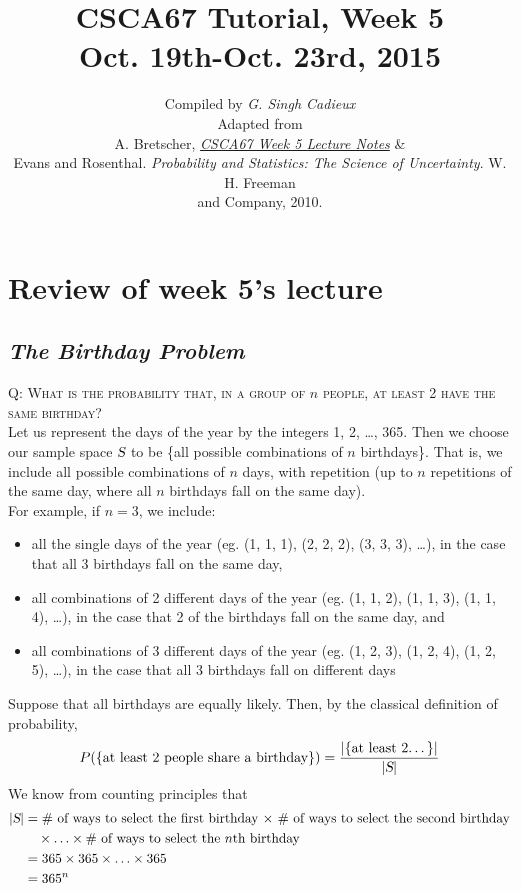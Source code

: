 \documentclass{article}
\title{\sc\LARGE CSCA67 Tutorial, Week 5\\
{\Large Oct. 19th-Oct. 23rd, 2015}}
\date{}
\author{\sc Compiled by {\em G. Singh Cadieux}\\[1ex]
\sc Adapted from\\
A. Bretscher, \href{http://www.utsc.utoronto.ca/~bretscher/a67/lectures/w5.pdf}{\em CSCA67 Week 5 Lecture Notes} \&\\
Evans and Rosenthal. \textit{Probability and Statistics: The Science of Uncertainty}.
W. H. Freeman\\
and Company, 2010.}
\begin{document}
\maketitle

\section{\sc Review of week 5's lecture}
\subsection{\em The Birthday Problem}

\textsc{Q: What is the probability that, in a group of $n$ people, at least 2 have the same birthday?}\\[1em]
Let us represent the days of the year by the integers 1, 2, \ldots, 365. Then we choose our sample space $\textsl{S}$ to be \{all possible combinations of $n$ birthdays\}. That is, we include all possible combinations of $n$ days, with repetition (up to $n$ repetitions of the same day, where all $n$ birthdays fall on the same day).\\[1ex]
For example, if $n=3$, we include:
\begin{itemize}
\item all the single days of the year (eg. (1, 1, 1), (2, 2, 2), (3, 3, 3), \ldots), in the case that all 3 birthdays fall on the same day,
\item all combinations of 2 different days of the year (eg. (1, 1, 2), (1, 1, 3), (1, 1, 4), \ldots), in the case that 2 of the birthdays fall on the same day, and
\item all combinations of 3 different days of the year (eg. (1, 2, 3), (1, 2, 4), (1, 2, 5), \ldots), in the case that all 3 birthdays fall on different days
\end{itemize}
Suppose that all birthdays are equally likely. Then, by the classical definition of probability,
\begin{equation*}
P(\{\text{at least 2 people share a birthday}\})=\dfrac{|\{\text{at least 2\ldots}\}|}{|\textsl{S}|}
\end{equation*}
We know from counting principles that
\begin{align*}
|\textsl{S}|& =\text{\# of ways to select the first birthday $\times$ \# of ways to select the second birthday}\\
& \quad\times\ldots\times\text{\# of ways to select the $n$th birthday}\\
& =365\times 365\times\ldots\times 365\\
& =365^n
\end{align*}
\end{document}
